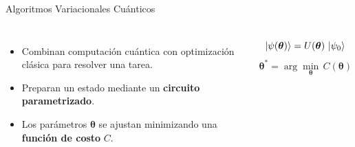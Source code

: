 \documentclass[aspectratio=169,xcolor=dvipsnames]{beamer}
\begin{document}
    

\begin{frame}{Algoritmos Variacionales Cuánticos}
\begin{columns}

  \begin{itemize}
    \item Combinan computación cuántica con optimización clásica para resolver una tarea.
    \bigskip
    \item Preparan un estado mediante un \textbf{circuito parametrizado}.
    \bigskip
    \item Los parámetros $\boldsymbol{\theta}$ se ajustan minimizando una \textbf{función de costo} $C$.
  \end{itemize}

 \bigskip
  $$
    \ket{\psi(\boldsymbol{\theta})}=U(\boldsymbol{\theta})\,\ket{\psi_0}
  $$
  \bigskip
  \medskip
  $$
    \boldsymbol{\theta}^{*}=\arg\min_{\boldsymbol{\theta}}\, C(\boldsymbol{\theta})
  $$

\end{columns}
\end{frame}
\end{document}
